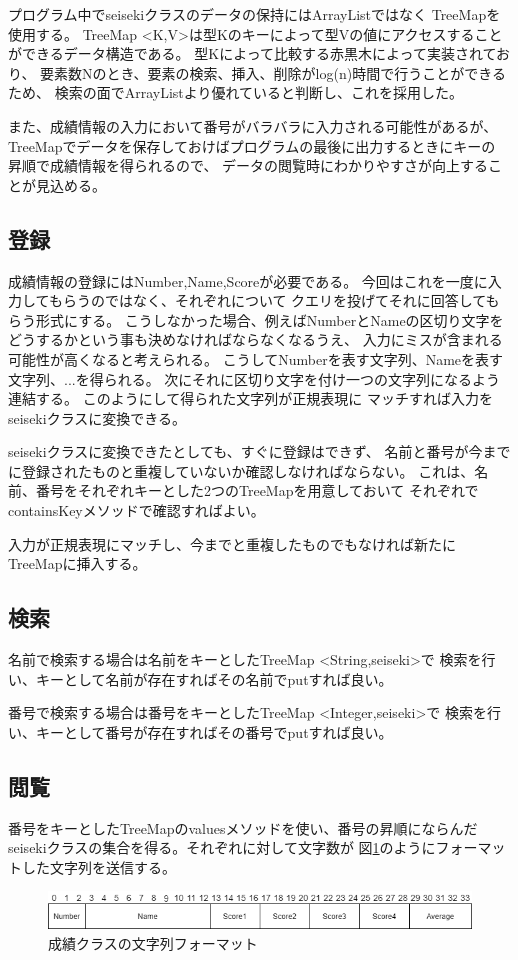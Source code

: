\documentclass[dvipdfmx]{jsarticle}
\begin{document}
プログラム中でseisekiクラスのデータの保持にはArrayListではなく
TreeMapを使用する。
TreeMap \textless K,V\textgreater は型Kのキーによって型Vの値にアクセスすることができるデータ構造である。
型Kによって比較する赤黒木によって実装されており、
要素数Nのとき、要素の検索、挿入、削除がlog(n)時間で行うことができるため、
検索の面でArrayListより優れていると判断し、これを採用した。

また、成績情報の入力において番号がバラバラに入力される可能性があるが、
TreeMapでデータを保存しておけばプログラムの最後に出力するときにキーの
昇順で成績情報を得られるので、
データの閲覧時にわかりやすさが向上することが見込める。

\subsection{登録}
成績情報の登録にはNumber,Name,Scoreが必要である。
今回はこれを一度に入力してもらうのではなく、それぞれについて
クエリを投げてそれに回答してもらう形式にする。
こうしなかった場合、例えばNumberとNameの区切り文字を
どうするかという事も決めなければならなくなるうえ、
入力にミスが含まれる可能性が高くなると考えられる。
こうしてNumberを表す文字列、Nameを表す文字列、...を得られる。
次にそれに区切り文字を付け一つの文字列になるよう連結する。
このようにして得られた文字列が正規表現に
マッチすれば入力をseisekiクラスに変換できる。

seisekiクラスに変換できたとしても、すぐに登録はできず、
名前と番号が今までに登録されたものと重複していないか確認しなければならない。
これは、名前、番号をそれぞれキーとした2つのTreeMapを用意しておいて
それぞれでcontainsKeyメソッドで確認すればよい。

入力が正規表現にマッチし、今までと重複したものでもなければ新たに
TreeMapに挿入する。

\subsection{検索}
名前で検索する場合は名前をキーとしたTreeMap \textless String,seiseki\textgreater で
検索を行い、キーとして名前が存在すればその名前でputすれば良い。

番号で検索する場合は番号をキーとしたTreeMap \textless Integer,seiseki\textgreater で
検索を行い、キーとして番号が存在すればその番号でputすれば良い。

\subsection{閲覧}
番号をキーとしたTreeMapのvaluesメソッドを使い、番号の昇順にならんだ
seisekiクラスの集合を得る。それぞれに対して文字数が
図\ref{seiseki_format}のようにフォーマットした文字列を送信する。
\begin{figure}[H]
  \centering
  \includegraphics[width=0.9\hsize]{../pic/seiseki_format.png}
  \caption{成績クラスの文字列フォーマット}
  \label{seiseki_format}
\end{figure}
\end{document}
